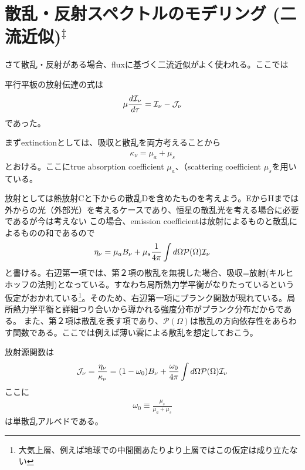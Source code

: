 \section{散乱・反射スペクトルのモデリング (二流近似)$^\ddagger$}

さて散乱・反射がある場合、fluxに基づく二流近似がよく使われる。ここでは

平行平板の放射伝達の式は
\begin{align}
\mu \frac{d {\mathcal{I}_\nu}}{d \tau} = {\mathcal{I}_\nu}  - {\mathcal{J}_\nu}
\label{eq:radtrantau_start}
\end{align}
であった。

まずextinctionとしては、吸収と散乱を両方考えることから
\begin{align}
\kappa_\nu = \mu_a + \mu_s
\label{eq:extsaa}
\end{align}
とおける。ここにtrue absorption coefficient $\mu_a$、（scattering coefficient $\mu_s$を用いている。

放射としては熱放射Cと下からの散乱Dを含めたものを考えよう。EからHまでは外からの光（外部光）を考えるケースであり、恒星の散乱光を考える場合に必要であるが今は考えない
この場合、emission coefficientは放射によるものと散乱によるものの和であるので
\begin{align}
\eta_\nu = \mu_a B_\nu + \mu_s \frac{1}{4 \pi} \int d \Omega \mathcal{P} (\Omega ) {\mathcal{I}_\nu}
\label{eq:emisaa}
\end{align}
と書ける。右辺第一項では、第２項の散乱を無視した場合、吸収=放射(キルヒホッフの法則)となっている。すなわち局所熱力学平衡がなりたっているという仮定がおかれている\footnote{大気上層、例えば地球での中間圏あたりより上層ではこの仮定は成り立たない}。そのため、右辺第一項にプランク関数が現れている。局所熱力学平衡と詳細つり合いから導かれる強度分布がプランク分布だからである。
また、第２項は散乱を表す項であり、$\mathcal{P} (\Omega)  $は散乱の方向依存性をあらわす関数である。ここでは例えば薄い雲による散乱を想定しておこう。

放射源関数は
\begin{align}
{\mathcal{J}_\nu}  = \frac{\eta_\nu}{\kappa_\nu} = (1 - \omega_0) B_\nu +   \frac{\omega_0}{4 \pi} \int d \Omega \mathcal{P} (\Omega ) {\mathcal{I}_\nu}
\label{eq:sourcef}
\end{align}
ここに
\begin{align}
\omega_0 \equiv \frac{\mu_s}{\mu_a  + \mu_s}
\label{eq:sia}
\end{align}
は単散乱アルベドである。

